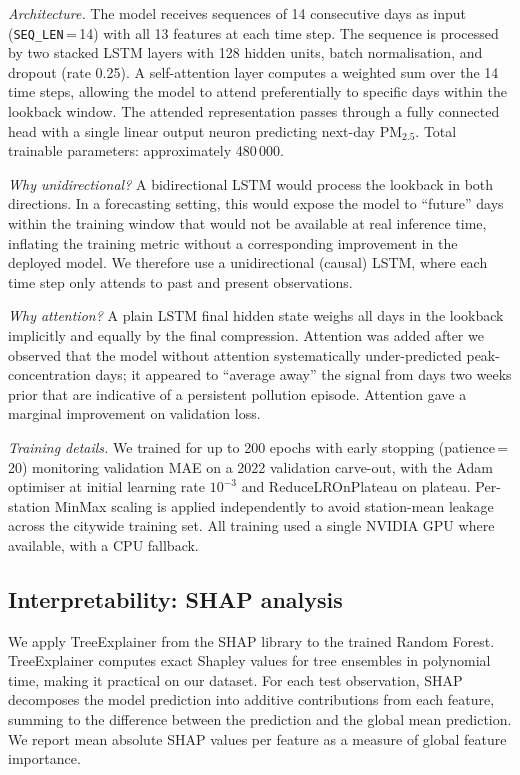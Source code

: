 \documentclass{iopjournal}
\begin{document}
\textit{Architecture.} The model receives sequences of 14 consecutive
days as input (\texttt{SEQ\_LEN}\,=\,14) with all 13 features at each
time step. The sequence is processed by two stacked LSTM layers with
128 hidden units, batch normalisation, and dropout (rate 0.25). A
self-attention layer computes a weighted sum over the 14 time steps,
allowing the model to attend preferentially to specific days within
the lookback window. The attended representation passes through a
fully connected head with a single linear output neuron predicting
next-day PM$_{2.5}$. Total trainable parameters: approximately
480\,000.

\textit{Why unidirectional?} A bidirectional LSTM would process the
lookback in both directions. In a forecasting setting, this would
expose the model to ``future'' days within the training window that
would not be available at real inference time, inflating the
training metric without a corresponding improvement in the deployed
model. We therefore use a unidirectional (causal) LSTM, where each
time step only attends to past and present observations.

\textit{Why attention?} A plain LSTM final hidden state weighs all
days in the lookback implicitly and equally by the final compression.
Attention was added after we observed that the model without
attention systematically under-predicted peak-concentration days; it
appeared to ``average away'' the signal from days two weeks prior
that are indicative of a persistent pollution episode. Attention gave
a marginal improvement on validation loss.

\textit{Training details.} We trained for up to 200 epochs with
early stopping (patience\,=\,20) monitoring validation MAE on a
2022 validation carve-out, with the Adam optimiser at initial
learning rate $10^{-3}$ and ReduceLROnPlateau on plateau. Per-station
MinMax scaling is applied independently to avoid station-mean
leakage across the citywide training set. All training used a single
NVIDIA GPU where available, with a CPU fallback.

\subsection{Interpretability: SHAP analysis}

We apply TreeExplainer from the SHAP library \cite{Lundberg2020} to
the trained Random Forest. TreeExplainer computes exact Shapley
values for tree ensembles in polynomial time, making it practical on
our dataset. For each test observation, SHAP decomposes the model
prediction into additive contributions from each feature, summing to
the difference between the prediction and the global mean prediction.
We report mean absolute SHAP values per feature as a measure of
global feature importance.
\end{document}
